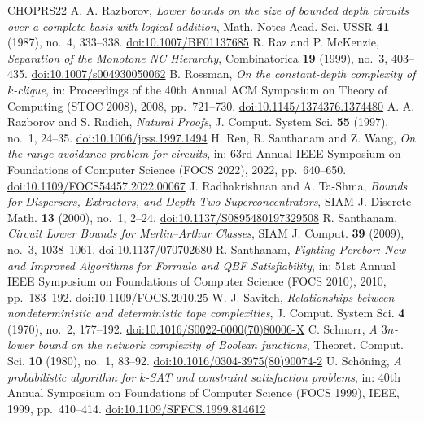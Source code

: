\begin{thebibliography}{CHOPRS22}
 A. A. Razborov, \emph{Lower bounds on the size of bounded depth circuits over a complete basis with logical addition}, Math. Notes Acad. Sci. USSR \textbf{41} (1987), no.~4, 333--338. \href{https://doi.org/10.1007/BF01137685}{doi:10.1007/BF01137685}
 R. Raz and P. McKenzie, \emph{Separation of the Monotone NC Hierarchy}, Combinatorica \textbf{19} (1999), no.~3, 403--435. \href{https://doi.org/10.1007/s004930050062}{doi:10.1007/s004930050062}
 B. Rossman, \emph{On the constant-depth complexity of $k$-clique}, in: Proceedings of the 40th Annual ACM Symposium on Theory of Computing (STOC 2008), 2008, pp.~721--730. \href{https://doi.org/10.1145/1374376.1374480}{doi:10.1145/1374376.1374480}
 A. A. Razborov and S. Rudich, \emph{Natural Proofs}, J. Comput. System Sci. \textbf{55} (1997), no.~1, 24--35. \href{https://doi.org/10.1006/jcss.1997.1494}{doi:10.1006/jcss.1997.1494}
 H. Ren, R. Santhanam and Z. Wang, \emph{On the range avoidance problem for circuits}, in: 63rd Annual IEEE Symposium on Foundations of Computer Science (FOCS 2022), 2022, pp.~640--650. \href{https://doi.org/10.1109/FOCS54457.2022.00067}{doi:10.1109/FOCS54457.2022.00067}
 J. Radhakrishnan and A. Ta-Shma, \emph{Bounds for Dispersers, Extractors, and Depth-Two Superconcentrators}, SIAM J. Discrete Math. \textbf{13} (2000), no.~1, 2--24. \href{https://doi.org/10.1137/S0895480197329508}{doi:10.1137/S0895480197329508}
 R. Santhanam, \emph{Circuit Lower Bounds for Merlin--Arthur Classes}, SIAM J. Comput. \textbf{39} (2009), no.~3, 1038--1061. \href{https://doi.org/10.1137/070702680}{doi:10.1137/070702680}
 R. Santhanam, \emph{Fighting Perebor: New and Improved Algorithms for Formula and QBF Satisfiability}, in: 51st Annual IEEE Symposium on Foundations of Computer Science (FOCS 2010), 2010, pp.~183--192. \href{https://doi.org/10.1109/FOCS.2010.25}{doi:10.1109/FOCS.2010.25}
 W. J. Savitch, \emph{Relationships between nondeterministic and deterministic tape complexities}, J. Comput. System Sci. \textbf{4} (1970), no.~2, 177--192. \href{https://doi.org/10.1016/S0022-0000(70)80006-X}{doi:10.1016/S0022-0000(70)80006-X}
 C. Schnorr, \emph{A $3n$-lower bound on the network complexity of Boolean functions}, Theoret. Comput. Sci. \textbf{10} (1980), no.~1, 83--92. \href{https://doi.org/10.1016/0304-3975(80)90074-2}{doi:10.1016/0304-3975(80)90074-2}
 U. Sch{\"o}ning, \emph{A probabilistic algorithm for $k$-SAT and constraint satisfaction problems}, in: 40th Annual Symposium on Foundations of Computer Science (FOCS 1999), IEEE, 1999, pp.~410--414. \href{https://doi.org/10.1109/SFFCS.1999.814612}{doi:10.1109/SFFCS.1999.814612}

\end{thebibliography}
